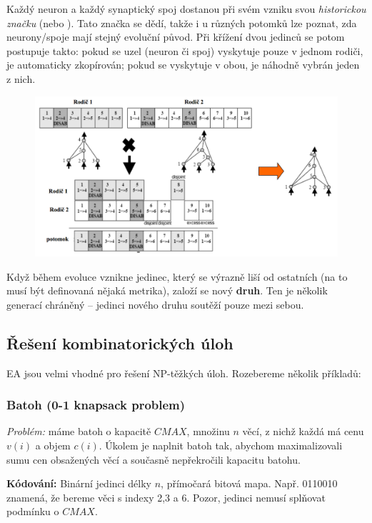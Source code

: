 Každý neuron a každý synaptický spoj dostanou při svém vzniku svou \textit{historickou značku} (nebo ). Tato značka se dědí, takže i u různých potomků lze poznat, zda neurony/spoje mají stejný evoluční původ. Při křížení dvou jedinců se potom postupuje takto: pokud se uzel (neuron či spoj) vyskytuje pouze v jednom rodiči, je automaticky zkopírován; pokud se vyskytuje v obou, je náhodně vybrán jeden z nich.
\begin{figure}[H]
	\includegraphics[width=\textwidth]{img/neat.png}
\end{figure}

Když během evoluce vznikne jedinec, který se výrazně liší od ostatních (na to musí být definovaná nějaká metrika), založí se nový \textbf{druh}. Ten je několik generací chráněný -- jedinci nového druhu soutěží pouze mezi sebou.


\subsection{Řešení kombinatorických úloh}
EA jsou velmi vhodné pro řešení NP-těžkých úloh. Rozebereme několik příkladů:

\subsubsection{Batoh (0-1 knapsack problem)}
\textit{Problém:} máme batoh o kapacitě $CMAX$, množinu $n$ věcí, z nichž každá má cenu $v(i)$ a objem $c(i)$. Úkolem je naplnit batoh tak, abychom maximalizovali sumu cen obsažených věcí a současně nepřekročili kapacitu batohu.

\textbf{Kódování:} Binární jedinci délky $n$, přímočará bitová mapa. Např. 0110010 znamená, že bereme věci s indexy 2,3 a 6. Pozor, jedinci nemusí splňovat podmínku o $CMAX$.

